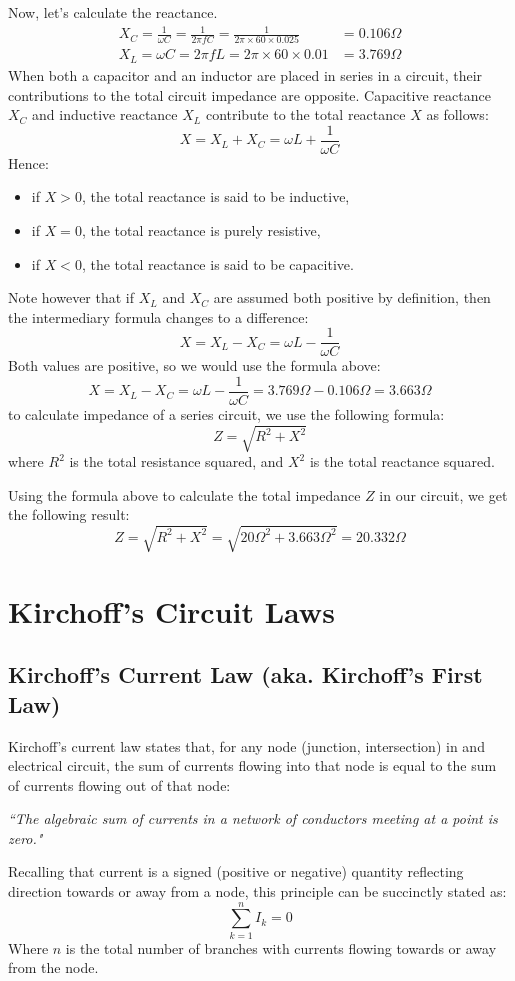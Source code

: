 \documentclass[12pt,a4paper,oneside]{article}
\begin{document}
Now, let's calculate the reactance.
\begin{align*}
	X_C = \frac{1}{\omega C} = \frac{1}{2 \pi f C} = \frac{1}{2 \pi \times 60 \times 0.025} &= 0.106\Omega \\
	X_L = \omega C = 2 \pi f L = 2 \pi \times 60 \times 0.01 &= 3.769\Omega
\end{align*}
When both a capacitor and an inductor are placed in series in a circuit, their contributions to the total circuit impedance are opposite. Capacitive reactance \(X_C\) and inductive reactance \(X_L\) contribute to the total reactance \(X\) as follows:
\[
	X = X_L + X_C = \omega L + \frac{1}{\omega C}
\]
Hence:
\begin{itemize}
	\item if \(X>0\), the total reactance is said to be inductive,
	\item if \(X=0\), the total reactance is purely resistive,
	\item if \(X<0\), the total reactance is said to be capacitive.
\end{itemize}
Note however that if \(X_L\) and \(X_C\) are assumed both positive by definition, then the intermediary formula changes to a difference:
\[
	X = X_L - X_C = \omega L - \frac{1}{\omega C}
\]
Both values are positive, so we would use the formula above:
\[
	X = X_L - X_C = \omega L - \frac{1}{\omega C} = 3.769\Omega - 0.106\Omega = 3.663\Omega
\]
to calculate impedance of a series circuit, we use the following formula:
\[
	Z = \sqrt{R^2 + X^2}
\]
where \(R^2\) is the total resistance squared, and \(X^2\) is the total reactance squared.

Using the formula above to calculate the total impedance \(Z\) in our circuit, we get the following result:
\[
	Z = \sqrt{R^2 + X^2} = \sqrt{20\Omega^2 + 3.663\Omega^2} = 20.332\Omega
\]
\section{Kirchoff's Circuit Laws}
\subsection{Kirchoff's Current Law (aka. Kirchoff's First Law)}
Kirchoff's current law states that, for any node (junction, intersection) in and electrical circuit, the sum of currents flowing into that node is equal to the sum of currents flowing out of that node:

\begin{center}
	\textit{``The algebraic sum of currents in a network of conductors meeting at a point is zero."}
\end{center}
Recalling that current is a signed (positive or negative) quantity reflecting direction towards or away from a node, this principle can be succinctly stated as:
\[
	\sum_{k=1}^n I_k = 0
\]
Where \(n\) is the total number of branches with currents flowing towards or away from the node.
\end{document}
